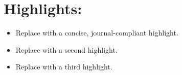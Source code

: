 \documentclass[11pt]{article}
\begin{document}
\section*{Highlights: \ManuscriptTitle}
\begin{itemize}[leftmargin=*,label=--]
  \item Replace with a concise, journal-compliant highlight.
  \item Replace with a second highlight.
  \item Replace with a third highlight.
\end{itemize}
\end{document}
